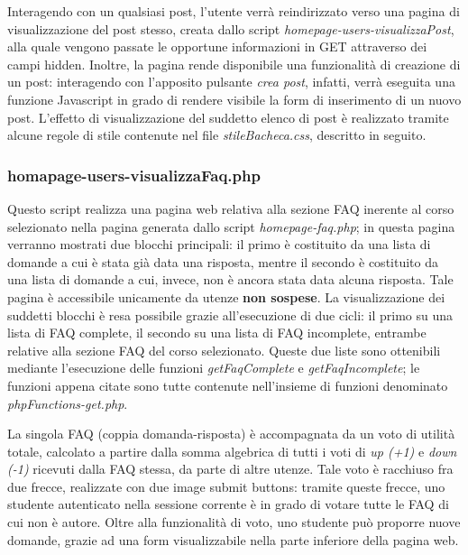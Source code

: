 \documentclass [a4paper,11pt]{book}
\begin{document}
Interagendo con un qualsiasi post, l'utente verrà reindirizzato verso una pagina di visualizzazione del post stesso, creata dallo script \emph{homepage-users-visualizzaPost}, alla quale vengono passate le opportune informazioni in GET attraverso dei campi hidden. Inoltre, la pagina rende disponibile una funzionalità di creazione di un post: interagendo con l'apposito pulsante \emph{crea post}, infatti, verrà eseguita una funzione Javascript in grado di rendere visibile la form di inserimento di un nuovo post. L'effetto di visualizzazione del suddetto elenco di post è realizzato tramite alcune regole di stile contenute nel file \emph{stileBacheca.css}, descritto in seguito.

\medskip

\subsubsection{homapage-users-visualizzaFaq.php}

Questo script realizza una pagina web relativa alla sezione FAQ inerente al corso selezionato nella pagina generata dallo script \emph{homepage-faq.php}; in questa pagina verranno mostrati due blocchi principali: il primo è costituito da una lista di domande a cui è stata già data una risposta, mentre il secondo è costituito da una lista di domande a cui, invece, non è ancora stata data alcuna risposta. Tale pagina è accessibile unicamente da utenze \textbf{non sospese}. La visualizzazione dei suddetti blocchi è resa possibile grazie all'esecuzione di due cicli: il primo su una lista di FAQ complete, il secondo su una lista di FAQ incomplete, entrambe relative alla sezione FAQ del corso selezionato. Queste due liste sono ottenibili mediante l'esecuzione delle funzioni \emph{getFaqComplete} e \emph{getFaqIncomplete}; le funzioni appena citate sono tutte contenute nell'insieme di funzioni denominato \emph{phpFunctions-get.php}. 

La singola FAQ (coppia domanda-risposta) è accompagnata da un voto di utilità totale, calcolato a partire dalla somma algebrica di tutti i voti di \emph{up (+1)} e \emph{down (-1)} ricevuti dalla FAQ stessa, da parte di altre utenze. Tale voto è racchiuso fra due frecce, realizzate con due image submit buttons: tramite queste frecce, uno studente autenticato nella sessione corrente è in grado di votare tutte le FAQ di cui non è autore. Oltre alla funzionalità di voto, uno studente può proporre nuove domande, grazie ad una form visualizzabile nella parte inferiore della pagina web.
\end{document}
